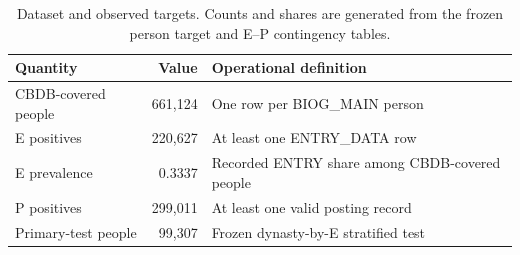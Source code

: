 \begin{table}[t]
\caption{Dataset and observed targets. Counts and shares are generated from the frozen person target and E--P contingency tables.}
\label{tab:dataset}
\centering
\begin{tabular}{lrl}
\toprule
Quantity & Value & Operational definition \\
\midrule
CBDB-covered people & 661,124 & One row per BIOG\_MAIN person \\
E positives & 220,627 & At least one ENTRY\_DATA row \\
E prevalence & 0.3337 & Recorded ENTRY share among CBDB-covered people \\
P positives & 299,011 & At least one valid posting record \\
Primary-test people & 99,307 & Frozen dynasty-by-E stratified test \\
\bottomrule
\end{tabular}
\end{table}
